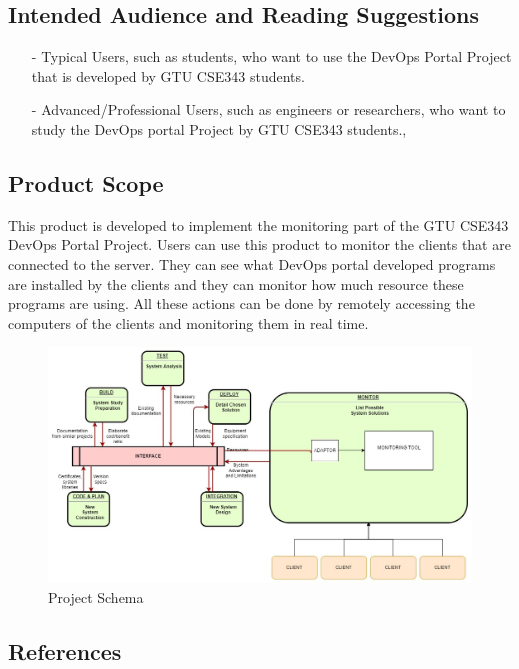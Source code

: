 \documentclass{article}
\begin{document}
     \subsection{Intended Audience and Reading Suggestions}
\flushleft 
\begin{itemize}
	\item[-] 
	Typical Users, such as students, who want to use the DevOps Portal Project that is developed by GTU CSE343 students.
	\item[-] Advanced/Professional Users, such as engineers or researchers, who want to study the DevOps portal Project by  GTU CSE343 students.,
\end{itemize}

     \subsection{Product Scope}

     This product is developed to implement the monitoring part of the GTU CSE343 DevOps Portal Project. Users can use this product to monitor the clients that are connected to the server. They can see what DevOps portal developed programs are installed by the clients and they can monitor how much resource these programs are using. All these actions can be done by remotely accessing the computers of the clients and monitoring them in real time.

\begin{figure}[ht]
\centering
\includegraphics[scale=0.3]{schema.jpg}
\caption{Project Schema \label{overflow}}
\end{figure}



\subsection{References}
     
\end{document}
